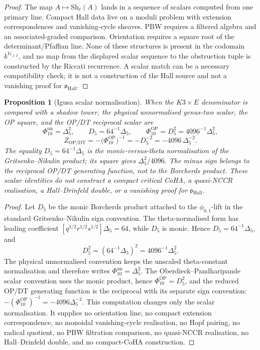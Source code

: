 \documentclass[11pt]{amsart}
\newtheorem{proposition}[theorem]{Proposition}
\theoremstyle{definition}
\theoremstyle{remark}
\begin{document}
\begin{proof}
The map \(A\mapsto\mathrm{Sh}_\ell(A)\) lands in a sequence of scalars
computed from one primary line. Compact Hall data live on a moduli problem
with extension correspondences and vanishing-cycle sheaves. PBW requires a
filtered algebra and an associated-graded comparison. Orientation requires
a square root of the determinant/Pfaffian line. None of these structures is
present in the codomain \(k^{\mathbb N_{\geq2}}\), and no map from the
displayed scalar sequence to the obstruction tuple is constructed by the
Riccati recurrence. A scalar match can be a necessary compatibility check;
it is not a construction of the Hall source and not a vanishing proof for
\(\mathfrak{o}_{\mathrm{Hall}}\).
\end{proof}

\begin{proposition}[Igusa scalar normalisation]
When the \(K3\times E\) denominator is compared with a shadow tower, the
physical unnormalised genus-two scalar, the OP square, and the OP/DT
reciprocal scalar are
\[
        \Phi_{10}^{\mathrm{un}}=\Delta_5^2,
        \qquad
        D_5=64^{-1}\Delta_5,
        \qquad
        \Phi_{10}^{\mathrm{OP}}=D_5^2=4096^{-1}\Delta_5^2,
\]
\[
        Z_{\mathrm{OP/DT}}
        =
        -\bigl(\Phi_{10}^{\mathrm{OP}}\bigr)^{-1}
        =
        -D_5^{-2}
        =
        -4096\,\Delta_5^{-2}.
\]
The equality \(D_5=64^{-1}\Delta_5\) is the monic-versus-theta
normalisation of the Gritsenko--Nikulin product; its square gives
\(\Delta_5^2/4096\). The minus sign belongs to the reciprocal OP/DT
generating function, not to the Borcherds product. These scalar identities
do not construct a compact critical CoHA, a quasi-NCCR realisation, a
Hall--Drinfeld double, or a vanishing proof for
\(\mathfrak{o}_{\mathrm{Hall}}\).
\end{proposition}

\begin{proof}
Let \(D_5\) be the monic Borcherds product attached to the
\(\phi_{0,1}\)-lift in the standard Gritsenko--Nikulin sign convention.
The theta-normalised form has leading coefficient
\([q^{1/2}r^{1/2}s^{1/2}]\Delta_5=64\), while \(D_5\) is monic. Hence
\(D_5=64^{-1}\Delta_5\), and
\[
        D_5^2=(64^{-1}\Delta_5)^2=4096^{-1}\Delta_5^2 .
\]
The physical unnormalised convention keeps the unscaled theta-constant
normalisation and therefore writes \(\Phi_{10}^{\mathrm{un}}=\Delta_5^2\).
The Oberdieck--Pandharipande scalar convention uses the monic product, hence
\(\Phi_{10}^{\mathrm{OP}}=D_5^2\), and the reduced OP/DT generating
function is the reciprocal with its separate sign convention:
\(-(\Phi_{10}^{\mathrm{OP}})^{-1}=-4096\Delta_5^{-2}\). This computation
changes only the scalar normalisation. It supplies no orientation line, no
compact extension correspondence, no monoidal vanishing-cycle realisation,
no Hopf pairing, no radical quotient, no PBW filtration comparison, no
quasi-NCCR realisation, no Hall--Drinfeld double, and no compact-CoHA
construction.
\end{proof}
\end{document}
